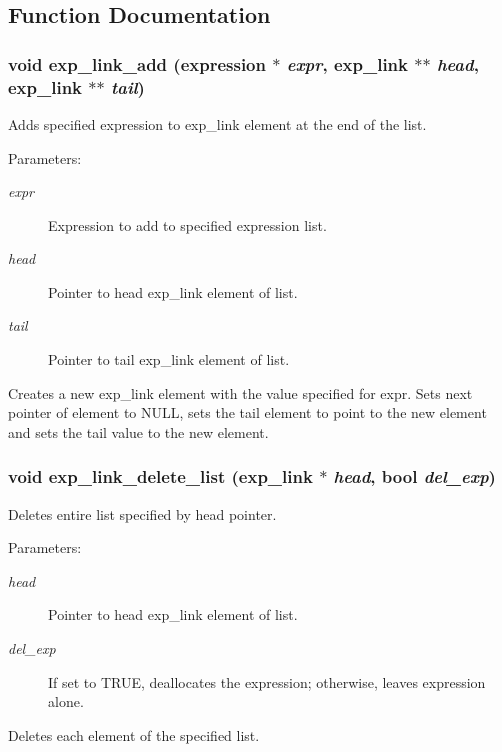 \subsection{Function Documentation}
\subsubsection{\setlength{\rightskip}{0pt plus 5cm}void exp\_\-link\_\-add ({\bf expression} $\ast$ {\em expr}, {\bf exp\_\-link} $\ast$$\ast$ {\em head}, {\bf exp\_\-link} $\ast$$\ast$ {\em tail})}\label{link_8c_a3}


Adds specified expression to exp\_\-link element at the end of the list.

\begin{Desc}
\item[Parameters: ]\par
\begin{description}
\item[{\em 
expr}]Expression to add to specified expression list. \item[{\em 
head}]Pointer to head exp\_\-link element of list. \item[{\em 
tail}]Pointer to tail exp\_\-link element of list.\end{description}
\end{Desc}
Creates a new exp\_\-link element with the value specified for expr. Sets next pointer of element to NULL, sets the tail element to point to the new element and sets the tail value to the new element. 
\subsubsection{\setlength{\rightskip}{0pt plus 5cm}void exp\_\-link\_\-delete\_\-list ({\bf exp\_\-link} $\ast$ {\em head}, {\bf bool} {\em del\_\-exp})}\label{link_8c_a20}


Deletes entire list specified by head pointer.

\begin{Desc}
\item[Parameters: ]\par
\begin{description}
\item[{\em 
head}]Pointer to head exp\_\-link element of list. \item[{\em 
del\_\-exp}]If set to TRUE, deallocates the expression; otherwise, leaves expression alone.\end{description}
\end{Desc}
Deletes each element of the specified list. 
